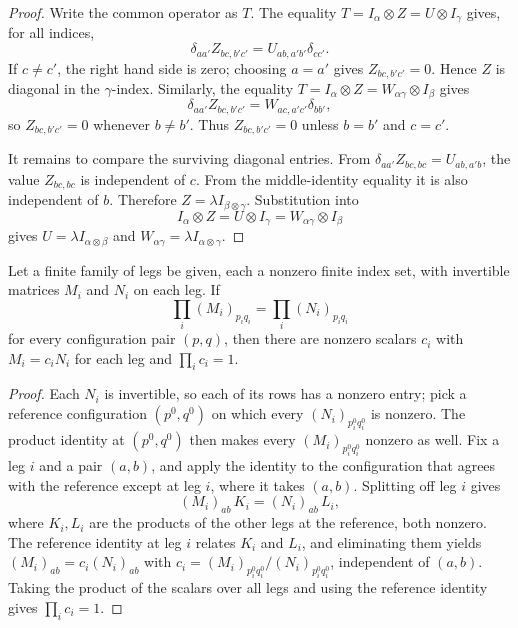 \begin{proof}\leanok
    Write the common operator as $T$. The equality
    $T=I_\alpha\otimes Z=U\otimes I_\gamma$ gives, for all indices,
    \[
        \delta_{aa'} Z_{bc,b'c'}
        =
        U_{ab,a'b'}\delta_{cc'}.
    \]
    If $c\neq c'$, the right hand side is zero; choosing $a=a'$ gives
    $Z_{bc,b'c'}=0$. Hence $Z$ is diagonal in the $\gamma$-index. Similarly,
    the equality $T=I_\alpha\otimes Z=W_{\alpha\gamma}\otimes I_\beta$ gives
    \[
        \delta_{aa'} Z_{bc,b'c'}
        =
        W_{ac,a'c'}\delta_{bb'} ,
    \]
    so $Z_{bc,b'c'}=0$ whenever $b\neq b'$. Thus $Z_{bc,b'c'}=0$ unless
    $b=b'$ and $c=c'$.

    It remains to compare the surviving diagonal entries. From
    $\delta_{aa'}Z_{bc,bc}=U_{ab,a'b}$, the value
    $Z_{bc,bc}$ is independent of $c$. From the middle-identity equality it is
    also independent of $b$. Therefore $Z=\lambda I_{\beta\otimes\gamma}$.
    Substitution into
    \[
        I_\alpha\otimes Z
        =
        U\otimes I_\gamma
        =
        W_{\alpha\gamma}\otimes I_\beta
    \]
    gives $U=\lambda I_{\alpha\otimes\beta}$ and
    $W_{\alpha\gamma}=\lambda I_{\alpha\otimes\gamma}$.
\end{proof}

\begin{theorem}%
    \label{thm:peps_piProductFormsScalar}
    \leanok
    Let a finite family of legs be given, each a nonzero finite index set, with
    invertible matrices $M_i$ and $N_i$ on each leg. If
    \[
        \prod_i (M_i)_{p_i q_i} = \prod_i (N_i)_{p_i q_i}
    \]
    for every configuration pair $(p,q)$, then there are nonzero scalars $c_i$
    with $M_i = c_i N_i$ for each leg and $\prod_i c_i = 1$.
\end{theorem}
\begin{proof}\leanok
    Each $N_i$ is invertible, so each of its rows has a nonzero entry; pick a
    reference configuration $(p^0,q^0)$ on which every $(N_i)_{p^0_i q^0_i}$ is
    nonzero. The product identity at $(p^0,q^0)$ then makes every
    $(M_i)_{p^0_i q^0_i}$ nonzero as well. Fix a leg $i$ and a pair $(a,b)$, and
    apply the identity to the configuration that agrees with the reference
    except at leg $i$, where it takes $(a,b)$. Splitting off leg $i$ gives
    \[
        (M_i)_{ab}\, K_i = (N_i)_{ab}\, L_i ,
    \]
    where $K_i,L_i$ are the products of the other legs at the reference, both
    nonzero. The reference identity at leg $i$ relates $K_i$ and $L_i$, and
    eliminating them yields $(M_i)_{ab} = c_i (N_i)_{ab}$ with
    $c_i = (M_i)_{p^0_i q^0_i}/(N_i)_{p^0_i q^0_i}$, independent of $(a,b)$.
    Taking the product of the scalars over all legs and using the reference
    identity gives $\prod_i c_i = 1$.
\end{proof}

